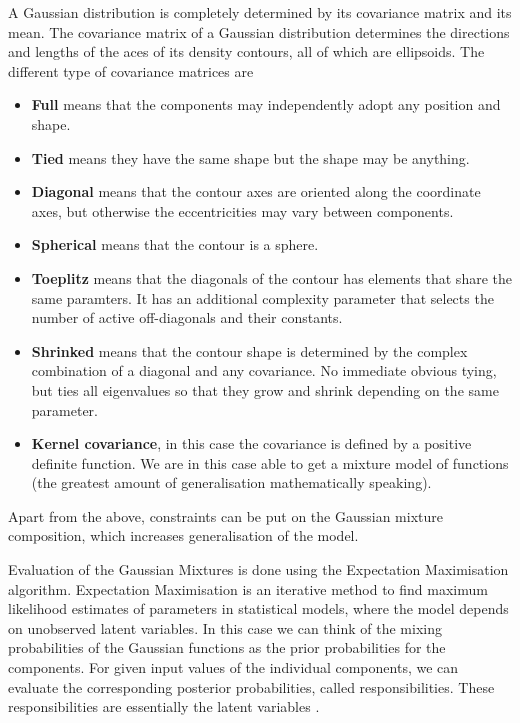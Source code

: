 \documentclass{book}
\begin{document}
A Gaussian distribution is completely determined by its covariance matrix and its mean. The covariance matrix of a Gaussian distribution determines the directions and lengths of the aces of its density contours, all of which are ellipsoids. The different type of covariance matrices are

\begin{itemize}
	\item \textbf{Full} means that the components may independently adopt any position and shape.
	\item \textbf{Tied} means they have the same shape but the shape may be anything.
	\item \textbf{Diagonal} means that the contour axes are oriented along the coordinate axes, but otherwise the eccentricities may vary between components.
	\item \textbf{Spherical} means that the contour is a sphere.
	\item \textbf{Toeplitz} means that the diagonals of the contour has elements that share the same paramters. It has an additional complexity parameter that selects the number of active off-diagonals and their constants.
	\item \textbf{Shrinked} means that the contour shape is determined by the complex combination of a diagonal and any covariance. No immediate obvious tying, but ties all eigenvalues so that they grow and shrink depending on the same parameter.
	\item \textbf{Kernel covariance}, in this case the covariance is defined by a positive definite function. We are in this case able to get a mixture model of functions (the greatest amount of generalisation mathematically speaking).
\end{itemize}

Apart from the above, constraints can be put on the Gaussian mixture composition, which increases generalisation of the model\cite{UL:8}.

Evaluation of the Gaussian Mixtures is done using the Expectation Maximisation algorithm. Expectation Maximisation is an iterative method to find maximum likelihood estimates of parameters in statistical models, where the model depends on unobserved latent variables. In this case we can think of the mixing probabilities of the Gaussian functions as the prior probabilities for the components. For given input values of the individual components, we can evaluate the corresponding posterior probabilities, called responsibilities. These responsibilities are essentially the latent variables\cite{UL:3} .
\end{document}
